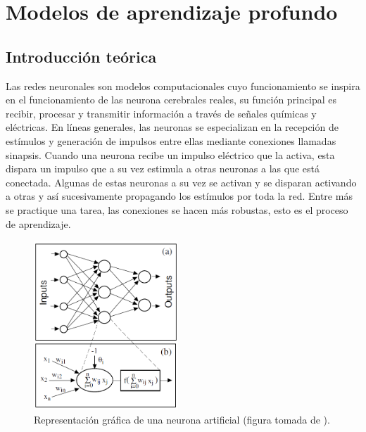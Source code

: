 \chapter{Modelos de aprendizaje profundo}
\label{ANNs}

\section{Introducción teórica}

Las redes neuronales son modelos computacionales cuyo funcionamiento se inspira en el funcionamiento de las 
neurona cerebrales reales, su función principal es recibir, procesar y transmitir información a través de señales
químicas y eléctricas. En líneas generales, las neuronas se especializan en la recepción de estímulos y generación
de impulsos entre ellas mediante conexiones llamadas sinapsis. Cuando una neurona recibe un impulso 
eléctrico que la activa, esta dispara un impulso que a su vez estimula a otras neuronas a las que está conectada. 
Algunas de estas neuronas a su vez se activan y se disparan activando a otras y así sucesivamente 
propagando los estímulos por toda la red. Entre más se practique una tarea, las conexiones se hacen más robustas, 
esto es el proceso de aprendizaje. 

\begin{figure}[h!]
    \begin{center}
      \includegraphics[height=2.5in]{Figures/esquema_red.PNG}
      \caption{ Representación gráfica de una neurona artificial (figura tomada de \cite{gutierrez}). }
      \label{perceptron}
    \end{center}
  \end{figure}

